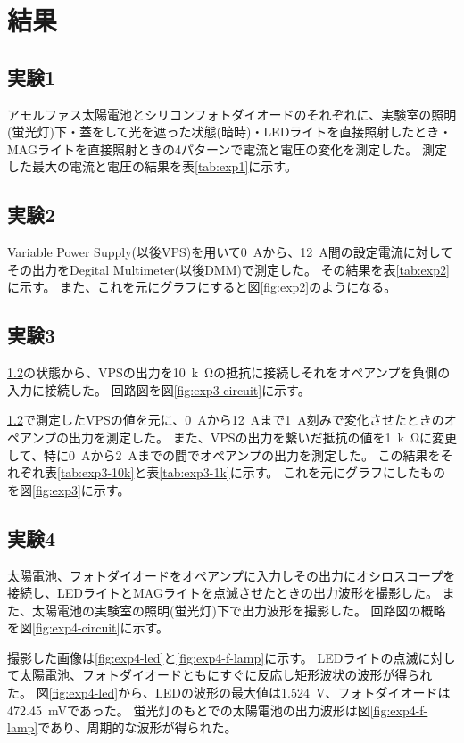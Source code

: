 \documentclass[../../../main]{subfiles}
\begin{document}
\section{結果}

\subsection{実験1}
アモルファス太陽電池とシリコンフォトダイオードのそれぞれに、実験室の照明(蛍光灯)下・蓋をして光を遮った状態(暗時)・LEDライトを直接照射したとき・MAGライトを直接照射ときの4パターンで電流と電圧の変化を測定した。
測定した最大の電流と電圧の結果を表\ref{tab:exp1}に示す。


\subsection{実験2}\label{subsec:exp2}
Variable Power Supply(以後VPS)を用いて\SI{0}{A}から、\SI{12}{A}間の設定電流に対してその出力をDegital Multimeter(以後DMM)で測定した。
その結果を表\ref{tab:exp2}に示す。
また、これを元にグラフにすると図\ref{fig:exp2}のようになる。



\subsection{実験3}
\ref{subsec:exp2}の状態から、VPSの出力を\SI{10}{k\ohm}の抵抗に接続しそれをオペアンプを負側の入力に接続した。
回路図を図\ref{fig:exp3-circuit}に示す。

\ref{subsec:exp2}で測定したVPSの値を元に、\SI{0}{A}から\SI{12}{A}まで\SI{1}{A}刻みで変化させたときのオペアンプの出力を測定した。
また、VPSの出力を繋いだ抵抗の値を\SI{1}{k\ohm}に変更して、特に\SI{0}{A}から\SI{2}{A}までの間でオペアンプの出力を測定した。
この結果をそれぞれ表\ref{tab:exp3-10k}と表\ref{tab:exp3-1k}に示す。
これを元にグラフにしたものを図\ref{fig:exp3}に示す。




\subsection{実験4}
太陽電池、フォトダイオードをオペアンプに入力しその出力にオシロスコープを接続し、LEDライトとMAGライトを点滅させたときの出力波形を撮影した。
また、太陽電池の実験室の照明(蛍光灯)下で出力波形を撮影した。
回路図の概略を図\ref{fig:exp4-circuit}に示す。

撮影した画像は\ref{fig:exp4-led}と\ref{fig:exp4-f-lamp}に示す。
LEDライトの点滅に対して太陽電池、フォトダイオードともにすぐに反応し矩形波状の波形が得られた。
図\ref{fig:exp4-led}から、LEDの波形の最大値は\SI{1.524}{V}、フォトダイオードは\SI{472.45}{mV}であった。
蛍光灯のもとでの太陽電池の出力波形は図\ref{fig:exp4-f-lamp}であり、周期的な波形が得られた。
\end{document}
